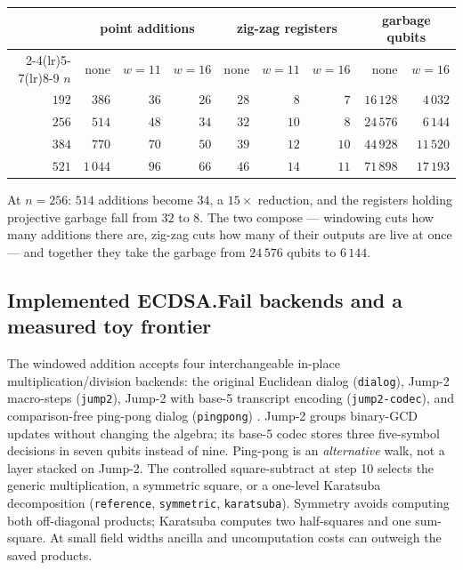 \documentclass[11pt]{article}
\newcommand{\code}[1]{\texttt{#1}}
\theoremstyle{plain}
\theoremstyle{remark}
\begin{document}
\begin{center}\small
\begin{tabular}{@{}rrrrrrrrr@{}}
\toprule
& \multicolumn{3}{c}{point additions} & \multicolumn{3}{c}{zig-zag registers} & \multicolumn{2}{c}{garbage qubits}\\
\cmidrule(lr){2-4}\cmidrule(lr){5-7}\cmidrule(lr){8-9}
$n$ & none & $w{=}11$ & $w{=}16$ & none & $w{=}11$ & $w{=}16$ & none & $w{=}16$\\
\midrule
$192$ & $386$ & $36$ & $26$ & $28$ & $8$ & $7$ & $16\,128$ & $4\,032$\\
$256$ & $514$ & $48$ & $34$ & $32$ & $10$ & $8$ & $24\,576$ & $6\,144$\\
$384$ & $770$ & $70$ & $50$ & $39$ & $12$ & $10$ & $44\,928$ & $11\,520$\\
$521$ & $1\,044$ & $96$ & $66$ & $46$ & $14$ & $11$ & $71\,898$ & $17\,193$\\
\bottomrule
\end{tabular}
\end{center}

\noindent
At $n=256$: $514$ additions become $34$, a $15\times$ reduction,
and the registers holding projective garbage fall from $32$ to $8$. The two
compose --- windowing cuts how many additions there are, zig-zag cuts how many of their outputs are
live at once --- and together they take the garbage from $24\,576$ qubits to $6\,144$.

\subsection{Implemented ECDSA.Fail backends and a measured toy frontier}\label{ec:sec:pareto}

The windowed addition accepts four interchangeable in-place multiplication/division
backends: the original Euclidean dialog (\code{dialog}), Jump-2 macro-steps
(\code{jump2}), Jump-2 with base-5 transcript encoding
(\code{jump2-codec}), and comparison-free ping-pong dialog
(\code{pingpong}) \cite{ec:ecdsafail26}. Jump-2 groups binary-GCD updates
without changing the algebra; its base-5 codec stores three five-symbol
decisions in seven qubits instead of nine. Ping-pong is an \emph{alternative}
walk, not a layer stacked on Jump-2. The controlled square-subtract at step 10
selects the generic multiplication, a symmetric square, or a one-level
Karatsuba decomposition (\code{reference}, \code{symmetric},
\code{karatsuba}). Symmetry avoids computing both off-diagonal products;
Karatsuba computes two half-squares and one sum-square. At small field widths
ancilla and uncomputation costs can outweigh the saved products.
\end{document}
